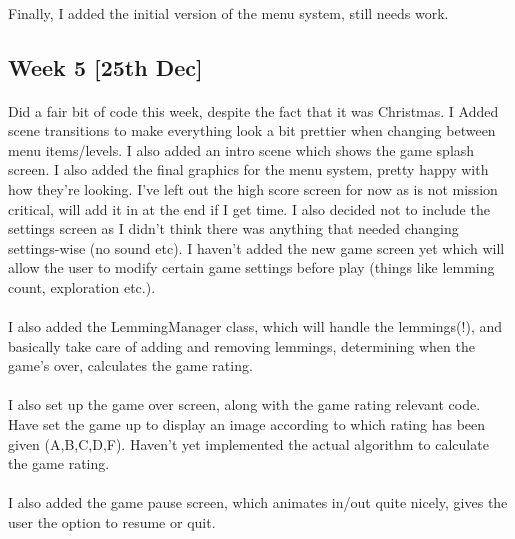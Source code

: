 \documentclass[a4paper,oneside]{report}
\begin{document}
\paragraph{} Finally, I added the initial version of the menu system, still needs work.



\subsection{Week 5 [25th Dec]}

\paragraph{} Did a fair bit of code this week, despite the fact that it was Christmas. I Added scene transitions to make everything look a bit prettier when changing between menu items/levels. I also added an intro scene which shows the game splash screen. I also added the final graphics for the menu system, pretty happy with how they’re looking. I’ve left out the high score screen for now as is not mission critical, will add it in at the end if I get time. I also decided not to include the settings screen as I didn’t think there was anything that needed changing settings-wise (no sound etc). I haven’t added the new game screen yet which will allow the user to modify certain game settings before play (things like lemming count, exploration etc.).

\paragraph{} I also added the LemmingManager class, which will handle the lemmings(!), and basically take care of adding and removing lemmings, determining when the game’s over, calculates the game rating.

\paragraph{} I also set up the game over screen, along with the game rating relevant code. Have set the game up to display an image according to which rating has been given (A,B,C,D,F). Haven’t yet implemented the actual algorithm to calculate the game rating.

\paragraph{} I also added the game pause screen, which animates in/out quite nicely, gives the user the option to resume or quit.
\end{document}
